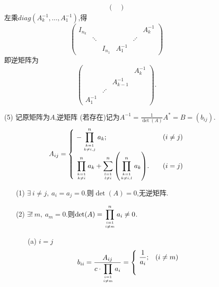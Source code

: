\documentclass{article}
\begin{document}
\begin{enumerate}
\begin{enumerate}
\begin{align*}
\begin{pmatrix}
            \end{pmatrix}
        \end{align*}
        左乘$diag(A_k^{-1},\ldots,A_1^{-1})$,得
        \[
            \begin{pmatrix}
                I_{n_k} &        &         &          &         & A_k^{-1}\\
                        & \ddots &         &          & \iddots & \\
                        &        & I_{n_1} & A_1^{-1} &         & 
            \end{pmatrix}
        \]
        即逆矩阵为
        \[
            \begin{pmatrix}
                         &         &              & A_k^{-1}\\
                         &         & A_{k-1}^{-1} & \\
                         & \iddots &              & \\
                A_1^{-1} &         &              & 
            \end{pmatrix}.
        \]
        \item [(5)]记原矩阵为$A$,逆矩阵 (若存在)记为$A^{-1}=\frac{1}{\det(A)}A^*=B=(b_{ij})$.
        \[  
            A_{ij}=
            \begin{cases}
                \ \displaystyle{-\prod\limits_{k=1\atop k\neq i,j}^n a_k}; \quad &(i\neq j)\\
                \ \displaystyle{\prod\limits_{k=1\atop k\neq i}^n a_k +\sum\limits_{l=1\atop l\neq i}^n \left(\prod\limits_{k=1\atop k\neq i,l}^n a_k \right)}. \quad &(i=j)
            \end{cases}
        \]
        \begin{enumerate}
            \item [(1)]$\exists\ i\neq j,\ a_i = a_j = 0$.则$\det(A)=0$,无逆矩阵.
            \item [(2)]$\exists !\ m,\ a_m = 0$.则$\det(A)=\displaystyle{\prod\limits_{i=1 \atop i\neq m}^n a_i}\neq 0$.
            \begin{enumerate}
                \item [(a)]$i=j$
                \[
                    b_{ii}=\frac{A_{ij}}{c\cdot \displaystyle{\prod\limits_{i=1 \atop i\neq m} a_i}}=
                    \begin{cases}
                        \ \displaystyle{\frac{1}{a_i}}; & (i\neq m)\\
                        &\\

\end{cases}\]
\end{enumerate}
\end{enumerate}
\end{enumerate}
\end{enumerate}
\end{document}
